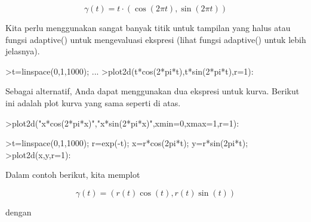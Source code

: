 \documentclass{article}
\begin{document}
\begin{eulernotebook}
\begin{eulercomment}
\begin{eulercomment}
\begin{eulercomment}
\begin{eulercomment}
\begin{eulercomment}
\begin{eulercomment}
\begin{eulercomment}
\begin{eulercomment}
\begin{eulercomment}
\begin{eulercomment}
\begin{eulercomment}
\end{eulercomment}
\begin{eulerformula}
\[
\gamma(t) = t \cdot (\cos(2\pi t),\sin(2\pi t))
\]
\end{eulerformula}
\begin{eulercomment}
Kita perlu menggunakan sangat banyak titik untuk tampilan yang halus
atau fungsi adaptive() untuk mengevaluasi ekspresi (lihat fungsi
adaptive() untuk lebih jelasnya).
\end{eulercomment}
\begin{eulerprompt}
>t=linspace(0,1,1000); ...
>plot2d(t*cos(2*pi*t),t*sin(2*pi*t),r=1):
\end{eulerprompt}
\begin{eulercomment}
Sebagai alternatif, Anda dapat menggunakan dua ekspresi untuk kurva.
Berikut ini adalah plot kurva yang sama seperti di atas.
\end{eulercomment}
\begin{eulerprompt}
>plot2d("x*cos(2*pi*x)","x*sin(2*pi*x)",xmin=0,xmax=1,r=1):
\end{eulerprompt}
\begin{eulerprompt}
>t=linspace(0,1,1000); r=exp(-t); x=r*cos(2pi*t); y=r*sin(2pi*t);
>plot2d(x,y,r=1):
\end{eulerprompt}
\begin{eulercomment}
Dalam contoh berikut, kita memplot

\end{eulercomment}
\begin{eulerformula}
\[
\gamma(t) = (r(t) \cos(t), r(t) \sin(t))
\]
\end{eulerformula}
\begin{eulercomment}
dengan


\end{eulercomment}
\end{eulercomment}
\end{eulercomment}
\end{eulercomment}
\end{eulercomment}
\end{eulercomment}
\end{eulercomment}
\end{eulercomment}
\end{eulercomment}
\end{eulercomment}
\end{eulercomment}
\end{eulernotebook}
\end{document}
